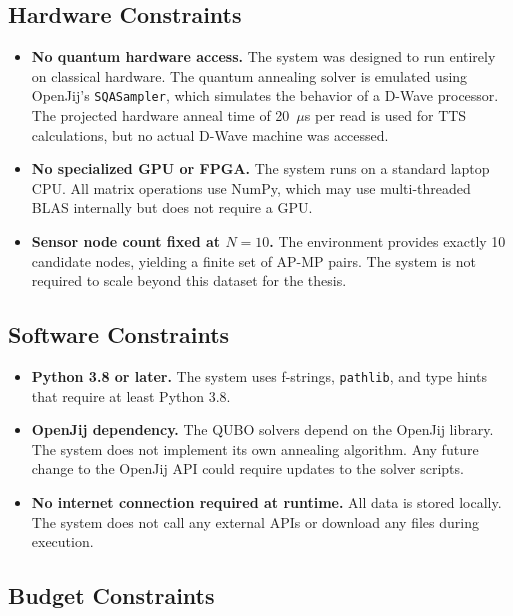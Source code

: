 \documentclass[12pt,a4paper]{article}
\begin{document}
\subsection{Hardware Constraints}

\begin{itemize}[leftmargin=2em]
    \item \textbf{No quantum hardware access.} The system was designed to run
          entirely on classical hardware. The quantum annealing solver is
          emulated using OpenJij's \texttt{SQASampler}, which simulates the
          behavior of a D-Wave processor. The projected hardware anneal time
          of 20~$\mu$s per read is used for TTS calculations, but no actual
          D-Wave machine was accessed.
    \item \textbf{No specialized GPU or FPGA.} The system runs on a standard
          laptop CPU. All matrix operations use NumPy, which may use
          multi-threaded BLAS internally but does not require a GPU.
    \item \textbf{Sensor node count fixed at $N = 10$.} The environment
          provides exactly 10 candidate nodes, yielding a finite set of
          AP-MP pairs. The system is not required to scale beyond this
          dataset for the thesis.
\end{itemize}

\subsection{Software Constraints}

\begin{itemize}[leftmargin=2em]
    \item \textbf{Python 3.8 or later.} The system uses f-strings,
          \texttt{pathlib}, and type hints that require at least Python 3.8.
    \item \textbf{OpenJij dependency.} The QUBO solvers depend on the OpenJij
          library. The system does not implement its own annealing algorithm.
          Any future change to the OpenJij API could require updates to the
          solver scripts.
    \item \textbf{No internet connection required at runtime.} All data is
          stored locally. The system does not call any external APIs or
          download any files during execution.
\end{itemize}

\subsection{Budget Constraints}
\end{document}
